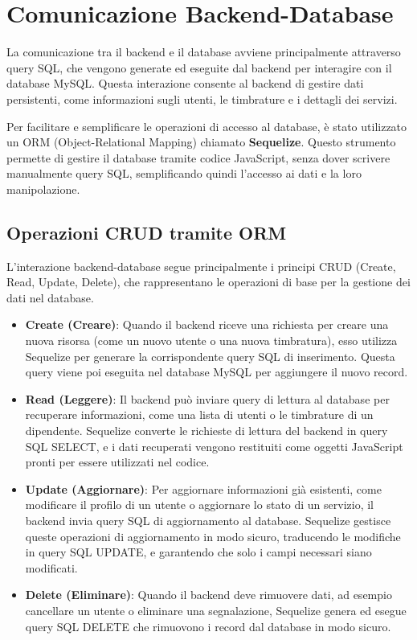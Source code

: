 \documentclass[twoside]{supsistudent}
\begin{document}
\section{Comunicazione Backend-Database}

La comunicazione tra il backend e il database avviene principalmente attraverso query SQL, che vengono generate ed eseguite dal backend per interagire con il database MySQL. Questa interazione consente al backend di gestire dati persistenti, come informazioni sugli utenti, le timbrature e i dettagli dei servizi.

Per facilitare e semplificare le operazioni di accesso al database, è stato utilizzato un ORM (Object-Relational Mapping) chiamato \textbf{Sequelize}. Questo strumento permette di gestire il database tramite codice JavaScript, senza dover scrivere manualmente query SQL, semplificando quindi l'accesso ai dati e la loro manipolazione.

\subsection{Operazioni CRUD tramite ORM}

L'interazione backend-database segue principalmente i principi CRUD (Create, Read, Update, Delete), che rappresentano le operazioni di base per la gestione dei dati nel database.

\begin{itemize}
  \item \textbf{Create (Creare)}: Quando il backend riceve una richiesta per creare una nuova risorsa (come un nuovo utente o una nuova timbratura), esso utilizza Sequelize per generare la corrispondente query SQL di inserimento. Questa query viene poi eseguita nel database MySQL per aggiungere il nuovo record.

  \item \textbf{Read (Leggere)}: Il backend può inviare query di lettura al database per recuperare informazioni, come una lista di utenti o le timbrature di un dipendente. Sequelize converte le richieste di lettura del backend in query SQL SELECT, e i dati recuperati vengono restituiti come oggetti JavaScript pronti per essere utilizzati nel codice.

  \item \textbf{Update (Aggiornare)}: Per aggiornare informazioni già esistenti, come modificare il profilo di un utente o aggiornare lo stato di un servizio, il backend invia query SQL di aggiornamento al database. Sequelize gestisce queste operazioni di aggiornamento in modo sicuro, traducendo le modifiche in query SQL UPDATE, e garantendo che solo i campi necessari siano modificati.

  \item \textbf{Delete (Eliminare)}: Quando il backend deve rimuovere dati, ad esempio cancellare un utente o eliminare una segnalazione, Sequelize genera ed esegue query SQL DELETE che rimuovono i record dal database in modo sicuro.
\end{itemize}
\end{document}
